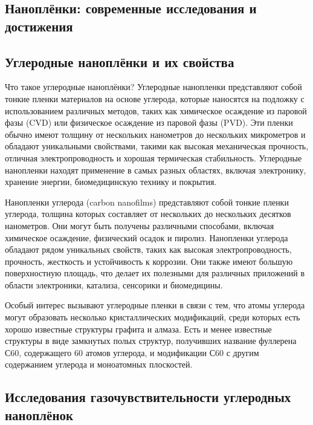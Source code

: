\documentclass[14pt]{extarticle}
\begin{document}
\subsection{Наноплёнки: современные исследования и достижения}



\subsection{Углеродные наноплёнки и их свойства}


Что такое углеродные наноплёнки?
Углеродные нанопленки представляют собой тонкие пленки материалов на основе углерода, которые наносятся на подложку с использованием различных методов, таких как химическое осаждение из паровой фазы (CVD) или физическое осаждение из паровой фазы (PVD). Эти пленки обычно имеют толщину от нескольких нанометров до нескольких микрометров и обладают уникальными свойствами, такими как высокая механическая прочность, отличная электропроводность и хорошая термическая стабильность. Углеродные нанопленки находят применение в самых разных областях, включая электронику, хранение энергии, биомедицинскую технику и покрытия.

Нанопленки углерода (carbon nanofilms) представляют собой тонкие пленки углерода, толщина которых составляет от нескольких до нескольких десятков нанометров. Они могут быть получены различными способами, включая химическое осаждение, физический осадок и пиролиз.
Нанопленки углерода обладают рядом уникальных свойств, таких как высокая электропроводность, прочность, жесткость и устойчивость к коррозии. Они также имеют большую поверхностную площадь, что делает их полезными для различных приложений в области электроники, катализа, сенсорики и биомедицины.

Особый интерес вызывают углеродные пленки в связи с тем, что атомы углерода могут образовать несколько кристаллических модификаций, среди которых есть хорошо известные структуры графита и алмаза. Есть и менее известные структуры в виде замкнутых полых структур, получивших название фуллерена С60, содержащего 60 атомов углерода, и модификации С60 с другим содержанием углерода и моноатомных плоскостей.







\subsection{Исследования газочувствительности углеродных наноплёнок}
\end{document}
